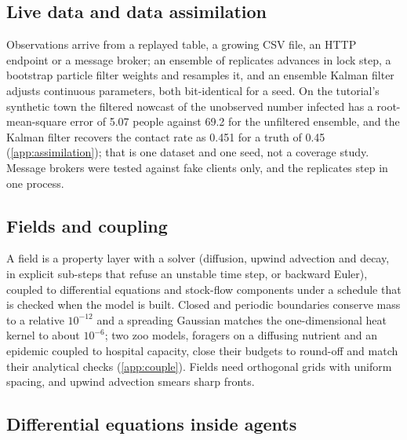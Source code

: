 \subsection{Live data and data assimilation}
\label{sec:assimilation}

Observations arrive from a replayed table, a growing CSV file, an HTTP endpoint or a message
broker; an ensemble of replicates advances in lock step, a bootstrap particle filter
\citep{gordon1993novel} weights and resamples it, and an ensemble Kalman filter
\citep{evensen2003ensemble} adjusts continuous parameters, both bit-identical for a seed. On
the tutorial's synthetic town the filtered nowcast of the unobserved number infected has a
root-mean-square error of 5.07 people against 69.2 for the unfiltered ensemble, and the
Kalman filter recovers the contact rate as 0.451 for a truth of 0.45 (\cref{app:assimilation});
that is one dataset and one seed, not a coverage study. Message brokers were tested against
fake clients only, and the replicates step in one process.

\subsection{Fields and coupling}
\label{sec:couple}

A field is a property layer with a solver (diffusion, upwind advection and decay, in explicit
sub-steps that refuse an unstable time step, or backward Euler), coupled to differential
equations and stock-flow components under a schedule that is checked when the model is built.
Closed and periodic boundaries conserve mass to a relative $10^{-12}$ and a spreading Gaussian
matches the one-dimensional heat kernel to about $10^{-6}$; two zoo models, foragers on a diffusing nutrient
and an epidemic coupled to hospital capacity, close their budgets to round-off and match their
analytical checks (\cref{app:couple}). Fields need orthogonal grids with uniform spacing, and
upwind advection smears sharp fronts.

\subsection{Differential equations inside agents}
\label{sec:agentode}

